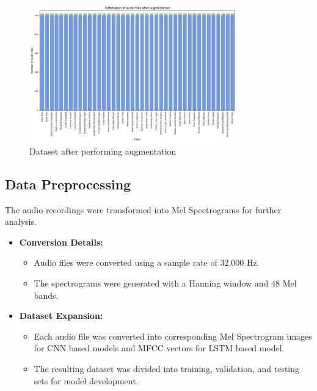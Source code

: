         \begin{figure}[h!]
            \centering
            \includegraphics[width=0.8\textwidth]{images/after_augmentation.png}
            \caption{Dataset after performing augmentation}
            \label{fig:visualization}
        \end{figure}

        \subsection{Data Preprocessing}
        The audio recordings were transformed into Mel Spectrograms for further
        analysis.

        \begin{itemize}
            \item \textbf{Conversion Details:}
                \begin{itemize}
                    \item Audio files were converted using a sample rate of 32,000 Hz.
                    \item The spectrograms were generated with a Hanning window and 48 Mel bands.
                \end{itemize}

            \item \textbf{Dataset Expansion:}
                \begin{itemize}
                    \item Each audio file was converted into corresponding Mel
                            Spectrogram images for CNN based models and MFCC vectors for LSTM based model.
                    \item The resulting dataset was divided into training, validation, and testing sets
                            for model development.
                \end{itemize}
        \end{itemize} 


